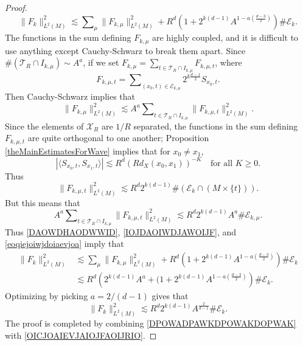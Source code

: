 \begin{proof}
    \begin{equation} \label{DAOWDHAODWWID}
        \| F_k \|_{L^2(M)}^2 \lesssim \sum\nolimits_\mu \| F_{k,\mu} \|_{L^2(M)}^2 + R^{d} \left( 1 + 2^{k(d-1)} A^{1 - a \left( \frac{d-3}{2} \right)} \right) \# \mathcal{E}_k.
    \end{equation}
%
The functions in the sum defining $F_{k,\mu}$ are highly coupled, and it is difficult to use anything except Cauchy-Schwarz to break them apart. Since $\# ( \mathcal{T}_R \cap I_{k,\mu}) \sim A^a$, if we set $F_{k,\mu} = \sum_{t \in \mathcal{T}_R \cap I_{k,\mu}} F_{k,\mu,t}$, where
%
\begin{equation}
    F_{k,\mu,t} = \sum\nolimits_{(x_0,t) \in \mathcal{E}_{k,\mu}} 2^{k \frac{d-1}{2}} {S\!}_{x_0,t}.
\end{equation}
%
Then Cauchy-Schwarz implies that
%
\begin{equation} \label{IOJDAOIWDJAWOIJF}
    \| F_{k,\mu} \|_{L^2(M)}^2 \lesssim A^a \sum\nolimits_{t \in \mathcal{T}_R \cap I_{k,\mu}} \| F_{k,\mu,t} \|_{L^2(M)}^2.
\end{equation}
%
Since the elements of $\mathcal{X}_R$ are $1/R$ separated, the functions in the sum defining $F_{k,\mu,t}$ are quite orthogonal to one another; Proposition \ref{theMainEstimatesForWave} implies that for $x_0 \neq x_1$,
%
\begin{equation}
    |\langle {S\!}_{x_0,t}, {S\!}_{x_1,t} \rangle| \lesssim R^d ( R d_X(x_0,x_1) )^{-K} \quad\text{for all $K \geq 0$}.
\end{equation}
%
Thus
%
\begin{equation}
    \| F_{k,\mu,t} \|_{L^2(M)}^2 \lesssim R^{d} 2^{k(d-1)} \# (\mathcal{E}_k \cap (M \times \{ t \})).
\end{equation}
%
But this means that
%
\begin{equation} \label{eoqiejoiwjdoiaevjoa}
    A^a \sum\nolimits_{t \in \mathcal{T}_R \cap I_{k,\mu}} \| F_{k,\mu,t} \|_{L^2(M)}^2 \lesssim R^{d} 2^{k(d-1)} A^a \# \mathcal{E}_{k,\mu}.
\end{equation}
%
Thus \eqref{DAOWDHAODWWID}, \eqref{IOJDAOIWDJAWOIJF}, and \eqref{eoqiejoiwjdoiaevjoa} imply that
%
\begin{equation}
\begin{split}
    \| F_k \|_{L^2(M)}^2 &\lesssim \sum\nolimits_\mu \| F_{k,\mu} \|_{L^2(M)}^2 + R^{d} \left( 1 + 2^{k(d-1)} A^{1 - a \left( \frac{d-3}{2} \right)} \right) \# \mathcal{E}_k\\
    &\lesssim R^{d} \left( 2^{k(d-1)} A^a + (1 + 2^{k(d-1)} A^{1 - a \left( \frac{d-3}{2} \right)} \right) \# \mathcal{E}_k.
\end{split}
\end{equation}
%
Optimizing by picking $a = 2 / (d-1)$ gives that
%
\begin{equation} \label{OICJOAIEVJAIOJFAOIJRIO}
    \| F_k \|_{L^2(M)}^2 \lesssim R^{d} 2^{k(d-1)} A^{\frac{2}{d-1}} \# \mathcal{E}_k.
\end{equation}
%
The proof is completed by combining \eqref{DPOWADPAWKDPOWAKDOPWAK} with \eqref{OICJOAIEVJAIOJFAOIJRIO}.
\end{proof}

